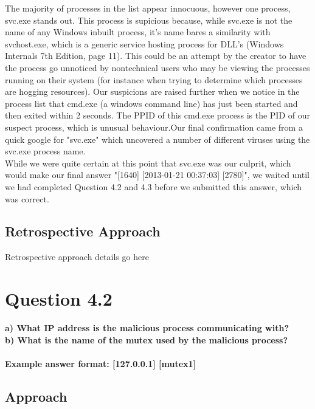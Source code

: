The majority of processes in the list appear innocuous, however one process, svc.exe stands out. This process is supicious because, while svc.exe is not the name of any Windows inbuilt process, it's name bares a similarity with svchost.exe, which is a generic service hosting process for DLL's (Windows Internals 7th Edition, page 11). This could be an attempt by the creator to have the process go unnoticed by nontechnical users who may be viewing the processes running on their system (for instance when trying to determine which processes are hogging resources). Our suspicions are raised further when we notice in the process list that cmd.exe (a windows command line) has just been started and then exited within 2 seconds. The PPID of this cmd.exe process is the PID of our suspect process, which is unusual behaviour.Our final confirmation came from a quick google for "svc.exe" which uncovered a number of different viruses using the svc.exe process name.\\
While we were quite certain at this point that svc.exe was our culprit, which would make our final answer "[1640] [2013-01-21 00:37:03] [2780]", we waited until we had completed Question 4.2 and 4.3 before we submitted this answer, which was correct.

\subsection{Retrospective Approach}
Retrospective approach details go here

\section{Question 4.2}
\textbf{a) What IP address is the malicious process communicating with?
\\b) What is the name of the mutex used by the malicious process?
\\\\
Example answer format: [127.0.0.1] [mutex1]}
\subsection{Approach}

